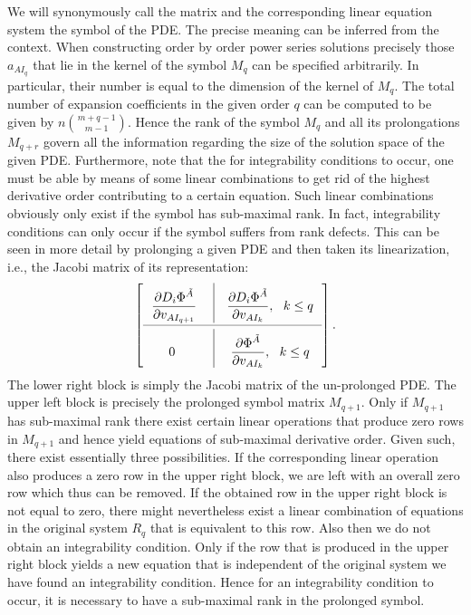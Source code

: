 We will synonymously call the matrix and the corresponding linear equation system the symbol of the PDE. The precise meaning can be inferred from the context. When constructing order by order power series solutions precisely those $a_{AI_q}$ that lie in the kernel of the symbol $M_q$ can be specified arbitrarily. In particular, their number is equal to the dimension of the kernel of $M_q$. The total number of expansion coefficients in the given order $q$ can be computed to be given by $n\binom{m+q-1}{m-1}$.
Hence the rank of the symbol $M_q$ and all its prolongations $M_{q+r}$ govern all the information regarding the size of the solution space of the given PDE. Furthermore, note that the for integrability conditions to occur, one must be able by means of some linear combinations to get rid of the highest derivative order contributing to a certain equation. Such linear combinations obviously only exist if the symbol has sub-maximal rank.  In fact, integrability conditions can only occur if the symbol suffers from rank defects. This can be seen in more detail by prolonging a given PDE and then taken its linearization, i.e., the Jacobi matrix of its representation:
\begin{align}
\def\arraystretch{2.5}
\begin{bmatrix}
      \ \ \mathlarger{{\frac{\partial D_i\Phi^{\tilde{A}}}{\partial v_{AI_{q+1}}}}} \ & \vline & \mathlarger{\frac{\partial D_i \Phi^{\tilde{A}}}{\partial v_{AI_k}}}, \ \ k \leq q \ \  \\
        \cmidrule(lr){1-3}
        \mathlarger{0} & \vline & \mathlarger{\frac{\partial \Phi^{\tilde{A}}}{\partial v_{AI_k}}}, \ \ k \leq q \ \
\end{bmatrix}.
\end{align}
The lower right block is simply the Jacobi matrix of the un-prolonged PDE. The upper left block is precisely the prolonged symbol matrix $M_{q+1}$. Only if $M_{q+1}$ has sub-maximal rank there exist certain linear operations that produce zero rows in $M_{q+1}$ and hence yield equations of sub-maximal derivative order. Given such, there exist essentially three possibilities. If the corresponding linear operation also produces a zero row in the upper right block, we are left with an overall zero row which thus can be removed. If the obtained row in the upper right block is not equal to zero, there might nevertheless exist a linear combination of equations in the original system $R_q$ that is equivalent to this row. Also then we do not obtain an integrability condition. Only if the row that is produced in the upper right block yields a new equation that is independent of the original system we have found an integrability condition.  
Hence for an integrability condition to occur, it is necessary to have a sub-maximal rank in the prolonged symbol.

